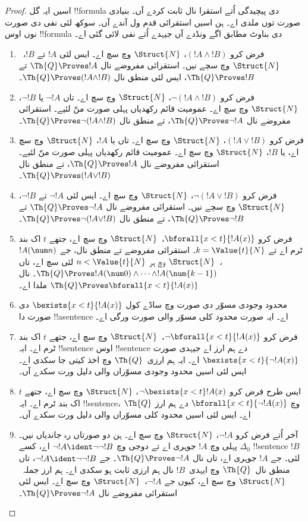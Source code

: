 \documentclass[../../../include/open-logic-section]{subfiles}
\begin{document}
\begin{proof}
اسیں ایہ گل !!{formula} دی پیچیدگی اُتے استقرا نال ثابت کردے آں۔
%
بنیادی صورت  توں ملدی اے۔
ہن اسیں استقرائی قدم ول آندے آں۔ سوکھ لئی نفی دی صورت نوں
اوس !!{formula} دی بناوٹ مطابق اگے ونڈدے آں جیہدے اُتے
نفی لائی گئی اے۔

\begin{enumerate}
\item فرض کرو $(!A \land !B)$، $\Struct{N}$ وچ سچ اے۔
ایس لئی $!A$ تے $!B$،~$\Struct{N}$ وچ سچے نیں۔
استقرائی مفروضے نال $\Th{Q} \Proves !A$ تے
$\Th{Q} \Proves !B$، ایس لئی منطق نال $\Th{Q} \Proves (!A \land !B)$۔
%
\item فرض کرو $\lnot (!A \land !B)$، $\Struct{N}$ وچ سچ اے۔
تاں $\lnot !A$ یا $\lnot !B$، $\Struct{N}$ وچ سچ اے۔
عمومیت قائم رکھدیاں پہلی صورت منّ لئیے۔ استقرائی مفروضے نال
$\Th{Q} \Proves \lnot !A$، تے منطق نال
$\Th{Q} \Proves \lnot (!A \land !B)$۔
%
\item فرض کرو $(!A \lor !B)$، $\Struct{N}$ وچ سچ اے۔
تاں یا $!A$، $\Struct{N}$ وچ سچ اے، یا $!B$، $\Struct{N}$
وچ سچ اے۔ عمومیت قائم رکھدیاں پہلی صورت منّ لئیے۔ استقرائی
مفروضے نال $\Th{Q} \Proves !A$، تے منطق نال
$\Th{Q} \Proves (!A \lor !B)$۔
%
\item فرض کرو $\lnot(!A \lor !B)$، $\Struct{N}$ وچ سچ اے۔
ایس لئی $\lnot !A$ تے $\lnot !B$، $\Struct{N}$ وچ سچے نیں۔
استقرائی مفروضے نال $\Th{Q} \Proves \lnot !A$ تے
$\Th{Q} \Proves \lnot !B$، تے منطق نال
$\Th{Q} \Proves \lnot(!A \lor !B)$۔
%
\item فرض کرو $\bforall{x<t}{!A(x)}$،~$\Struct{N}$ وچ سچ اے،
جتھے $t$ اک بند ٹرم اے تے $k=\Value{t}{N}$۔
استقرائی مفروضے تے منطق نال، جے $!A(\num n)$،~$\Struct{N}$ وچ
ہر $n < \Value{t}{N}$ لئی سچ اے، تاں
$\Th{Q} \Proves !A(\num 0) \land \dots \land !A(\num{k-1})$۔
 نال $\Th{Q} \Proves \bforall{x<t}{!A(x)}$ ملدا اے۔
%
\item محدود وجودی مسوّر دی صورت وچ ساڈے کول
$\bexists{x < t}{!A(x)}$ دی صورت دا !!a{sentence} اے۔
ایہ صورت محدود کلی مسوّر والی صورت ورگی اے۔
%
\item فرض کرو $\lnot \bforall{x<t}{!A(x)}$،~$\Struct{N}$ وچ
سچ اے، جتھے $t$ اک بند ٹرم اے۔ ایہ !!{sentence} اوس
!!{sentence} دے ہم ارز اے جیہدی صورت $\bexists{x<t}{\lnot !A(x)}$
اے۔ ایہ ہم ارزی~$\Th{Q}$ وچ اخذ کیتی جا سکدی اے۔ ایس لئی
اسیں محدود وجودی مسوّراں والی دلیل ورت سکدے آں۔
%
\item ایس طرح فرض کرو $\lnot \bexists{x<t}!A(x)$، $\Struct{N}$
وچ سچ اے، جتھے $t$ اک بند ٹرم اے۔ ایہ !!{sentence}،
$\Th{Q}$ وچ $\bforall{x<t}{\lnot!A(x)}$ دے ہم ارز اے۔
ایس لئی اسیں محدود کلی مسوّراں والی دلیل ورت سکدے آں۔
%
\item آخر اُتے فرض کرو $\lnot !A$، $\Struct{N}$ وچ سچ اے۔
ہن دو صورتاں رہ جاندیاں نیں۔ پہلی وچ $!A$ جوہری اے تے
دوجی وچ $\lnot !A \ident \lnot\lnot !B$ اے، کسے
$\Delta_0$ !!{sentence} $!B$ لئی۔
جے $!A$ جوہری اے، تاں  نال
$\Th{Q} \Proves \lnot !A$۔
جے $\lnot !A \ident \lnot\lnot !B$، تاں منطق نال~$\Th{Q}$
وچ ایہدی~$!B$ نال ہم ارزی ثابت ہو سکدی اے۔ ہم ارز جملہ~$\Struct{N}$
وچ سچ اے، کیوں جے $\lnot !A$،~$\Struct{N}$ وچ سچ اے۔
ایس لئی استقرائی مفروضے نال $\Th{Q} \Proves \lnot !A$۔
\end{enumerate}
\end{proof}
\end{document}
